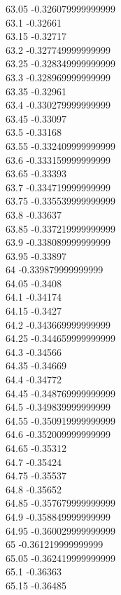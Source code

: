 {63.05	-0.326079999999999\\
63.1	-0.32661\\
63.15	-0.32717\\
63.2	-0.327749999999999\\
63.25	-0.328349999999999\\
63.3	-0.328969999999999\\
63.35	-0.32961\\
63.4	-0.330279999999999\\
63.45	-0.33097\\
63.5	-0.33168\\
63.55	-0.332409999999999\\
63.6	-0.333159999999999\\
63.65	-0.33393\\
63.7	-0.334719999999999\\
63.75	-0.335539999999999\\
63.8	-0.33637\\
63.85	-0.337219999999999\\
63.9	-0.338089999999999\\
63.95	-0.33897\\
64	-0.339879999999999\\
64.05	-0.3408\\
64.1	-0.34174\\
64.15	-0.3427\\
64.2	-0.343669999999999\\
64.25	-0.344659999999999\\
64.3	-0.34566\\
64.35	-0.34669\\
64.4	-0.34772\\
64.45	-0.348769999999999\\
64.5	-0.349839999999999\\
64.55	-0.350919999999999\\
64.6	-0.352009999999999\\
64.65	-0.35312\\
64.7	-0.35424\\
64.75	-0.35537\\
64.8	-0.35652\\
64.85	-0.357679999999999\\
64.9	-0.358849999999999\\
64.95	-0.360029999999999\\
65	-0.361219999999999\\
65.05	-0.362419999999999\\
65.1	-0.36363\\
65.15	-0.36485\\
}
